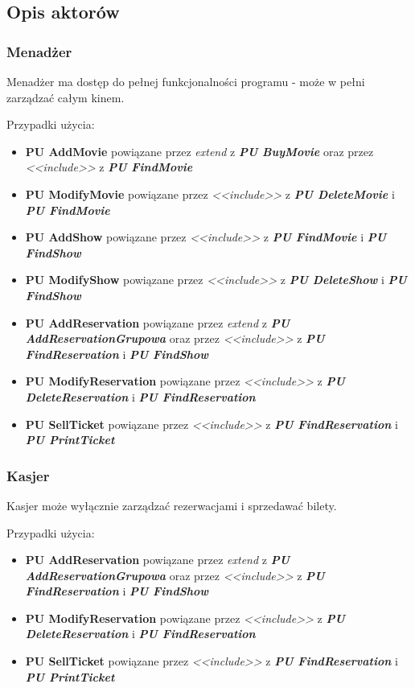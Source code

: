 \documentclass{article}
\begin{document}
	\newpage
	\subsection{Opis aktorów}
	\subsubsection{Menadżer}
	\par Menadżer ma dostęp do pełnej funkcjonalności programu - może w pełni zarządzać całym kinem.
	\par Przypadki użycia:
	\begin{itemize}
		\item \textbf{PU AddMovie} powiązane przez \textit{extend} z \textit{\textbf{PU BuyMovie}} oraz przez \textit{<<include>>} z \textit{\textbf{PU FindMovie}}
		\item \textbf{PU ModifyMovie} powiązane przez \textit{<<include>>} z \textit{\textbf{PU DeleteMovie}} i \textit{\textbf{PU FindMovie}}
		\item \textbf{PU AddShow} powiązane przez \textit{<<include>>} z \textit{\textbf{PU FindMovie}} i \textit{\textbf{PU FindShow}}
		\item \textbf{PU ModifyShow} powiązane przez \textit{<<include>>} z \textit{\textbf{PU DeleteShow}} i \textit{\textbf{PU FindShow}}
		\item \textbf{PU AddReservation} powiązane przez \textit{extend} z \textit{\textbf{PU AddReservationGrupowa}} oraz przez \textit{<<include>>} z \textit{\textbf{PU FindReservation}} i \textit{\textbf{PU FindShow}}
		\item \textbf{PU ModifyReservation} powiązane przez \textit{<<include>>} z \textit{\textbf{PU DeleteReservation}} i \textit{\textbf{PU FindReservation}}
		\item \textbf{PU SellTicket} powiązane przez \textit{<<include>>} z \textit{\textbf{PU FindReservation}} i \textit{\textbf{PU PrintTicket}}
	\end{itemize}
	
	\subsubsection{Kasjer}
	\par Kasjer może wyłącznie zarządzać rezerwacjami i sprzedawać bilety.
	\par Przypadki użycia:
	\begin{itemize}
		\item \textbf{PU AddReservation} powiązane przez \textit{extend} z \textit{\textbf{PU AddReservationGrupowa}} oraz przez \textit{<<include>>} z \textit{\textbf{PU FindReservation}} i \textit{\textbf{PU FindShow}}
		\item \textbf{PU ModifyReservation} powiązane przez \textit{<<include>>} z \textit{\textbf{PU DeleteReservation}} i \textit{\textbf{PU FindReservation}}
		\item \textbf{PU SellTicket} powiązane przez \textit{<<include>>} z \textit{\textbf{PU FindReservation}} i \textit{\textbf{PU PrintTicket}}
	\end{itemize}
	
\end{document}
